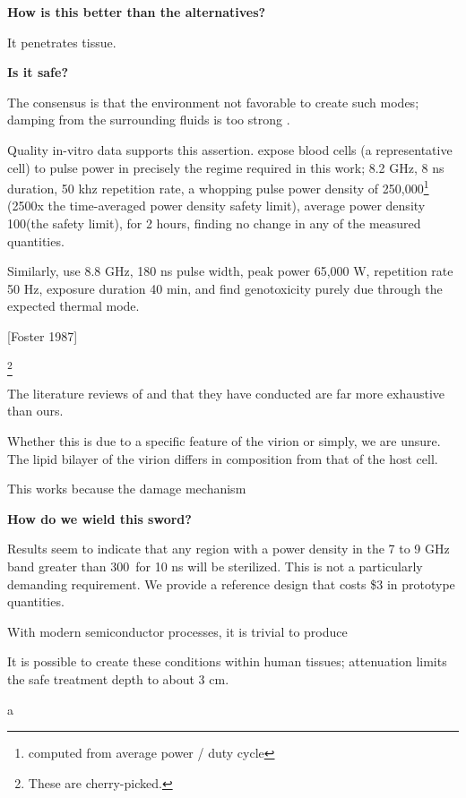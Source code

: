 \documentclass[fleqn,10pt]{paper}
\begin{document}
{\Large \textbf{How is this better than the alternatives?}}

It penetrates tissue.

{\Large \textbf{Is it safe?}}

The consensus is that the environment not favorable to create such modes; damping from the surrounding fluids is too strong \cite{Vibrational2002}. 

Quality in-vitro data supports this assertion. \cite{Cytogenetic2006} expose blood cells (a representative cell) to pulse power in precisely the regime required in this work; 8.2 GHz, 8 ns duration, 50 khz repetition rate, a whopping pulse power density of 250,000\Wsqm\footnote{computed from average power / duty cycle} (2500x the time-averaged power density safety limit), average power density 100\Wsqm (the safety limit), for 2 hours, finding no change in any of the measured quantities. 

Similarly, \cite{DNA2004} use 8.8 GHz, 180 ns pulse width, peak power 65,000 W, repetition rate 50 Hz, exposure duration 40 min, and find genotoxicity purely due through the expected thermal mode. 

[Foster 1987]

\footnote{These are cherry-picked.}

The literature reviews of \cite{ICNIRP2020} and \cite{C95} that they have conducted are far more exhaustive than ours.

Whether this is due to a specific feature of the virion or simply, we are unsure. The lipid bilayer of the virion differs in composition from that of the host cell.

This works because the damage mechanism 

{\Large \textbf{How do we wield this sword?}}

Results seem to indicate that any region with a power density in the 7 to 9 GHz band greater than 300\Wsqm \ for 10 ns will be sterilized. This is not a particularly demanding requirement. We provide a reference design that costs \$3 in prototype quantities.

With modern semiconductor processes, it is trivial to produce 

It is possible to create these conditions within human tissues; attenuation limits the safe treatment depth to about 3 cm.

\begin{autem}
	a
\end{autem}


\clearpage

\printbibliography[heading=none, title={}]
\end{document}
